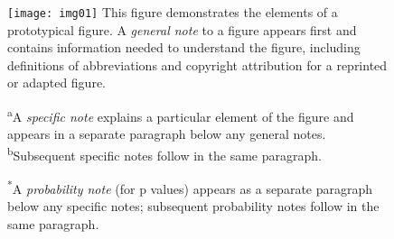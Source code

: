 \begin{figure}[!htb]
  \label{fig:a1}
  \texttt{[image: img01]} %
  \noteheader This figure demonstrates the elements of a
  prototypical figure. A \textit{general note} to a figure appears first
  and contains information needed to understand the figure, including
  definitions of abbreviations and copyright attribution for a reprinted
  or adapted figure.

  \textsuperscript{a}A \textit{specific note} explains a
  particular element of the figure and appears in a separate paragraph
  below any general notes. \textsuperscript{b}Subsequent specific
  notes follow in the same paragraph.

  \textsuperscript{*}A \textit{probability note} (for p values) appears
  as a separate paragraph below any specific notes; subsequent probability
  notes follow in the same paragraph.
\end{figure}